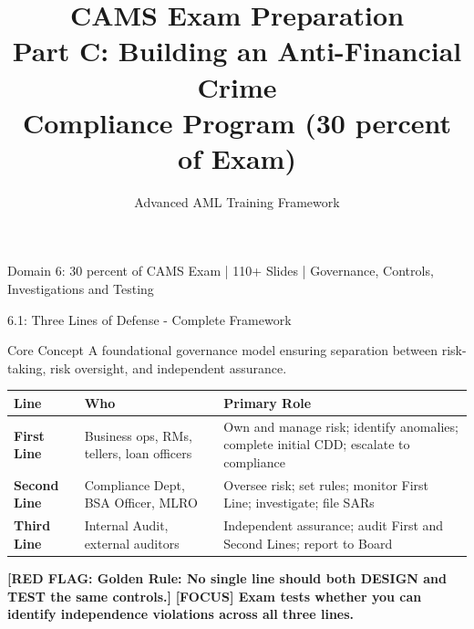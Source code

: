 \documentclass[11pt,a4paper]{beamer}
\title[CAMS Domain C]{CAMS Exam Preparation\\Part C: Building an Anti-Financial Crime\\Compliance Program (30 percent of Exam)}
\author{Advanced AML Training Framework}
\date{}
\renewcommand{\tiny}{\fontsize{5pt}{6pt}\selectfont}
\newcommand{\examfocus}[1]{\textcolor{orange!80!black}{\textbf{[FOCUS] #1}}}
\newcommand{\redflag}[1]{\textcolor{red!80!black}{\textbf{[RED FLAG: #1]}}}
\begin{document}
\begin{frame}
	\titlepage
	\centering
	\tiny Domain 6: 30 percent of CAMS Exam | 110+ Slides | Governance, Controls, Investigations and Testing
\end{frame}


\begin{frame}{6.1: Three Lines of Defense - Complete Framework}
	\begin{block}{Core Concept}
		A foundational governance model ensuring separation between risk-taking, risk oversight, and independent assurance.
	\end{block}
	\begin{tabular}{p{}|p{}|p{}}
		\hline
		\rowcolor{lightgray}
		\textbf{Line} & \textbf{Who} & \textbf{Primary Role} \\
		\hline
		\textbf{First Line} & Business ops, RMs, tellers, loan officers & Own and manage risk; identify anomalies; complete initial CDD; escalate to compliance \\
		\hline
		\textbf{Second Line} & Compliance Dept, BSA Officer, MLRO & Oversee risk; set rules; monitor First Line; investigate; file SARs \\
		\hline
		\textbf{Third Line} & Internal Audit, external auditors & Independent assurance; audit First and Second Lines; report to Board \\
		\hline
	\end{tabular}
	\vspace{0.2cm}
	\redflag{Golden Rule: No single line should both DESIGN and TEST the same controls.}
	\examfocus{Exam tests whether you can identify independence violations across all three lines.}
\end{frame}
\end{document}
